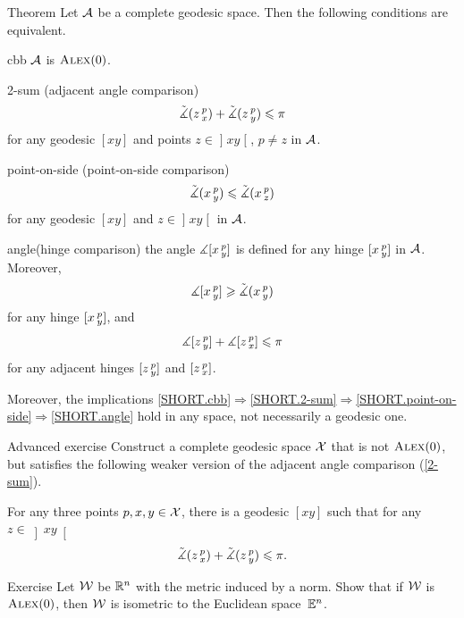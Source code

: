 \begin{thm}{Theorem}\label{thm:defs_of_alex} 
Let $\mathcal{A}$ be a complete geodesic space.
Then the following conditions are equivalent.

\begin{subthm}{cbb}
$\mathcal{A}$ is $\textup{\textsc{Alex}}(0)$.
\end{subthm}

\begin{subthm}{2-sum} 
(adjacent angle comparison)
\[\tilde\measuredangle(z\,{}^{p}_{x})
+\tilde\measuredangle(z\,{}^{p}_{y})\leqslant \pi\]
for any geodesic $[x y]$ and points $z\in \mathopen{]}x y\mathclose{[}$, $p\ne z$ in $\mathcal{A}$.
\end{subthm}

\begin{subthm}{point-on-side}
(point-on-side comparison)
\[\tilde\measuredangle(x\,{}^{p}_{y})\leqslant\tilde\measuredangle(x\,{}^{p}_{z})\]
for any geodesic $[x y]$ and $z\in \mathopen{]}x y\mathclose{[}$ in $\mathcal{A}$.
\end{subthm}

\begin{subthm}{angle}(hinge comparison)
the angle $\measuredangle[x\,{}^{p}_{y}]$ is defined for any hinge $[x\,{}^{p}_{y}]$ in $\mathcal{A}$.
Moreover, 
\[\measuredangle[x\,{}^{p}_{y}]\geqslant\tilde\measuredangle(x\,{}^{p}_{y})\]
for any hinge $[x\,{}^{p}_{y}]$, and
\[\measuredangle[z\,{}^{p}_{y}] + \measuredangle[z\,{}^{p}_{x}]\leqslant\pi\]
for any adjacent hinges $[z\,{}^{p}_{y}]$ and $[z\,{}^{p}_{x}]$.
\end{subthm}

Moreover, the implications \ref{SHORT.cbb}$\Rightarrow$\ref{SHORT.2-sum}$\Rightarrow$\ref{SHORT.point-on-side}$\Rightarrow$\ref{SHORT.angle} hold in any space, not necessarily a geodesic one.
\end{thm}

\begin{thm}{Advanced exercise}\label{ex:urysohn}
Construct a complete geodesic space $\mathcal{X}$ that is not $\textup{\textsc{Alex}}(0)$, but satisfies the following weaker version of the adjacent angle comparison (\ref{2-sum}).

For any three points $p,x,y\in \mathcal{X}$, there is a geodesic $[x y]$ such that for any $z\in \left]x y\right[$
\[\tilde\measuredangle(z\,{}^{p}_{x})+\tilde\measuredangle(z\,{}^{p}_{y})
\leqslant
\pi.\]
\end{thm}

\begin{thm}{Exercise}\label{ex:normCBB}
Let $\mathcal{W}$ be $\mathbb{R}^n$ with the metric induced by a norm.
Show that if $\mathcal{W}$ is $\textup{\textsc{Alex}}(0)$, then $\mathcal{W}$ is isometric to the Euclidean space~$\mathbb{E}^n$.
\end{thm}

